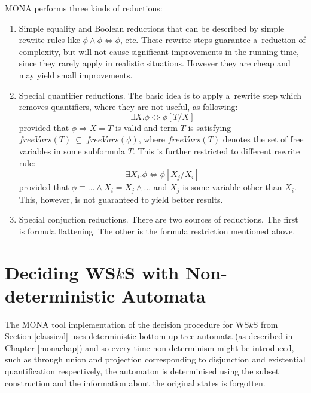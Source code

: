 MONA performs three kinds of reductions:
\begin{enumerate}
 \item Simple equality and Boolean reductions that can be described by simple
 rewrite rules like $\phi \wedge \phi \Leftrightarrow \phi$, etc. These rewrite
 steps guarantee a~reduction of complexity, but will not cause significant
 improvements in the running time, since they rarely apply in realistic
 situations. However they are cheap and may yield small improvements.

\item Special quantifier reductions. The basic idea is to apply a~rewrite step
which removes quantifiers, where they are not useful, as following:
\begin{equation}\exists X . \phi \Leftrightarrow \phi[T/X]\end{equation}
provided that $\phi \Rightarrow X = T$ is valid and term $T$ is satisfying
$\mathit{freeVars}(T)~\subseteq~\mathit{freeVars}(\phi)$, where $\mathit{freeVars}(T)$ denotes the set of free variables in some subformula
$T$.
This is further restricted to different rewrite rule: \begin{equation} \exists X_i .
\phi \Leftrightarrow \phi[X_j/X_i]\end{equation} provided that $\phi \equiv
\ldots \wedge X_i = X_j \wedge \ldots$ and $X_j$ is some variable other than
$X_i$. This, however, is not guaranteed to yield better results.

\item Special conjuction reductions. There are two sources of reductions. The
first is formula flattening. The other is  the formula restriction mentioned
above.
\end{enumerate}

 \chapter{Deciding WS$k$S with Non-deterministic Automata}\label{our}

The \textsc{MONA} tool implementation of the decision procedure for WS$k$S from
Section \ref{classical} uses deterministic bottom-up tree automata (as described
in Chapter \ref{monachap}) and so every time non-determinism might be
introduced, such as through union and projection corresponding to disjunction
and existential quantification respectively, the automaton is determinised using the
subset construction and the information about the original states is forgotten.


